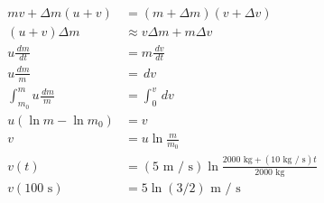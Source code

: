 \documentclass{esg8012pset}
\renewcommand{\d}{\,d}
\begin{document}
\begin{solution}
  \begin{align*}
   m v + \Delta m (u + v) & = (m + \Delta m) (v + \Delta v) \\
   (u + v)\Delta m & \approx v\Delta m + m\Delta v \\
   u\frac{\d m}{\d t} & = m\frac{\d v}{\d t} \\
   u\frac{\d m}{m} & = \d v \\
   \int_{m_0}^{m} u\frac{\d m}{m} & = \int_{0}^{v} \d v \\
   u(\ln m - \ln m_0) & = v \\
   v & = u\ln\frac{m}{m_0} \\
   v(t) & = (5\text{ m / s})\ln\frac{2000\text{ kg} + (10\text{ kg / s})t}{2000\text{ kg}} \\
   v(100\text{ s}) %
    & = 5\ln(3 / 2)\text{ m / s}
  \end{align*}
\end{solution}
\end{document}
